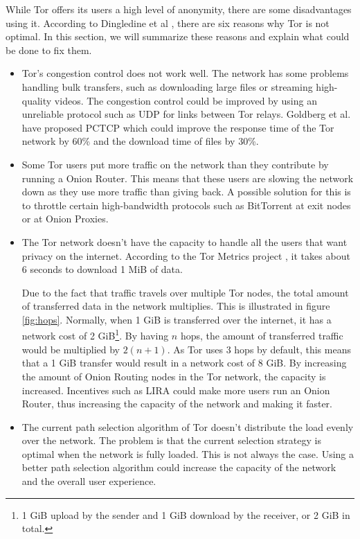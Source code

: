 \documentclass{article}
\begin{document}
		While Tor offers its users a high level of anonymity, there are some disadvantages using it. According to Dingledine et al \cite{dingledine2009performance}, there are six reasons why Tor is not optimal. In this section, we will summarize these reasons and explain what could be done to fix them.
		
		\begin{itemize}
			\item Tor's congestion control does not work well. The network has some problems handling bulk transfers, such as downloading large files or streaming high-quality videos. The congestion control could be improved by using an unreliable protocol such as UDP for links between Tor relays. Goldberg et al. \cite{alsabah2013pctcp} have proposed PCTCP which could improve the response time of the Tor network by 60\% and the download time of files by 30\%.	
		
			\item Some Tor users put more traffic on the network than they contribute by running a Onion Router. This means that these users are slowing the network down as they use more traffic than giving back. A possible solution for this is to throttle certain high-bandwidth protocols such as BitTorrent at exit nodes or at Onion Proxies.
		
			\item The Tor network doesn't have the capacity to handle all the users that want privacy on the internet. According to the Tor Metrics project \cite{tormetricsprojectwebsite}, it takes about 6 seconds to download 1 MiB of data.
			
			Due to the fact that traffic travels over multiple Tor nodes, the total amount of transferred data in the network multiplies. This is illustrated in figure \ref{fig:hops}. Normally, when 1 GiB is transferred over the internet, it has a network cost of 2 GiB\footnote{1 GiB upload by the sender and 1 GiB download by the receiver, or 2 GiB in total.}. By having $n$ hops, the amount of transferred traffic would be multiplied by $2(n+1)$. As Tor uses 3 hops by default, this means that a 1 GiB transfer would result in a network cost of 8 GiB. By increasing the amount of Onion Routing nodes in the Tor network, the capacity is increased. Incentives such as LIRA \cite{jansen13lira} could make more users run an Onion Router, thus increasing the capacity of the network and making it faster.	
		
			\item The current path selection algorithm of Tor doesn't distribute the load evenly over the network. The problem is that the current selection strategy is optimal when the network is fully loaded. This is not always the case. Using a better path selection algorithm could increase the capacity of the network and the overall user experience.		
		

\end{itemize}
\end{document}
